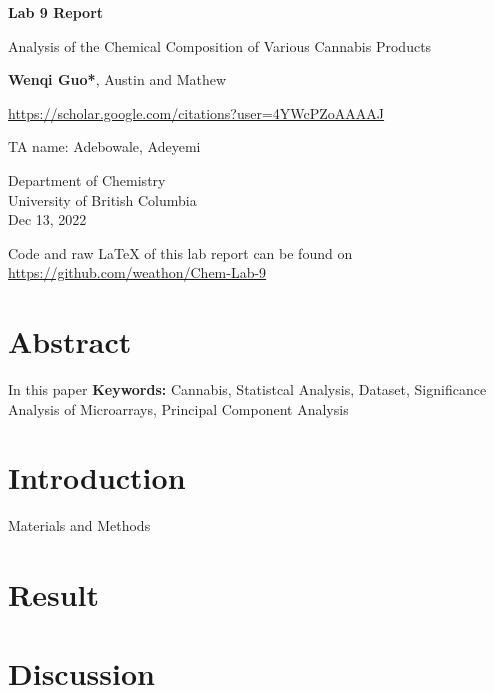 \documentclass{article}
\begin{document}
\begin{titlepage}
    \begin{center}
        \vspace*{1cm}
            
        \Huge
        \textbf{Lab 9 Report}
            
        \vspace{0.5cm}
        \LARGE
        Analysis of the Chemical Composition of Various Cannabis Products
            
        \vspace{1.5cm}
            
        \textbf{Wenqi Guo*}, Austin and Mathew
        \begin{small}
            \url{https://scholar.google.com/citations?user=4YWcPZoAAAAJ}
        \end{small}

            
        \vfill
            
TA name:
Adebowale, Adeyemi

            
        \vspace{0.8cm}
            

            
        \Large
        Department of Chemistry\\
        University of British Columbia\\
        Dec 13, 2022
            
    \end{center}
\end{titlepage}
Code and raw \LaTeX \; of this lab report can be found on \url{https://github.com/weathon/Chem-Lab-9}
\section*{Abstract}
In this paper
\textbf{Keywords: } Cannabis, Statistcal Analysis, Dataset, Significance Analysis of Microarrays, Principal Component Analysis
\newpage
\section{Introduction}Materials and Methods

\section{Result}
\section{Discussion}
\end{document}
